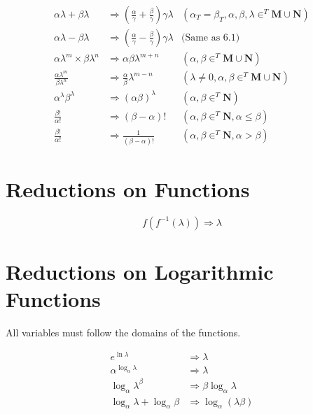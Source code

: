 \documentclass[11pt,a4paper]{book}
\begin{document}
\begin{align}
\alpha\lambda + \beta\lambda &\Rightarrow \left( \frac{\alpha}{\gamma} + \frac{\beta}{\gamma}\right)\gamma\lambda & \left( \alpha_T = \beta_T, \alpha, \beta, \lambda \in^T \mathbf{M} \cup \mathbf{N} \right)\\
\alpha\lambda - \beta\lambda &\Rightarrow \left( \frac{\alpha}{\gamma} - \frac{\beta}{\gamma}\right) \gamma\lambda & \text{(Same as 6.1)}\\
\alpha\lambda^m \times \beta\lambda^n &\Rightarrow  \alpha\beta\lambda^{m + n} & \left( \alpha, \beta \in^T \mathbf{M} \cup \mathbf{N} \right)\\
\frac{\alpha\lambda^{m}}{\beta\lambda^{n}} &\Rightarrow \frac{ \alpha}{\beta}\lambda^{m - n} & \left(\lambda \neq 0, \alpha, \beta \in^T \mathbf{M} \cup \mathbf{N} \right)\\
\alpha^{\lambda}\beta^{\lambda} &\Rightarrow \left(\alpha\beta\right)^\lambda & \left( \alpha, \beta \in^T \mathbf{N} \right)\\
\frac{\beta!}{\alpha!} &\Rightarrow \left(\beta - \alpha\right)! & \left( \alpha, \beta \in^T \mathbf{N}, \alpha \leq \beta \right)\\
\frac{\beta!}{\alpha!} &\Rightarrow \frac{1}{\left(\beta - \alpha\right)!} & \left( \alpha, \beta \in^T \mathbf{N}, \alpha > \beta \right)
\end{align}

\section{Reductions on Functions}

\begin{equation}
f(f^{-1}(\lambda)) \Rightarrow \lambda
\end{equation}

\section{Reductions on Logarithmic Functions}

All variables must follow the domains of the functions.

\begin{align}
e^{\ln\lambda} &\Rightarrow \lambda\\
\alpha^{\log_\alpha\lambda} &\Rightarrow \lambda \\
\log_{\alpha}\lambda^\beta &\Rightarrow \beta \log_\alpha \lambda \\
\log_{\alpha}\lambda + \log_\alpha\beta &\Rightarrow \log_{\alpha} (\lambda\beta) \\
\end{align}
\end{document}
